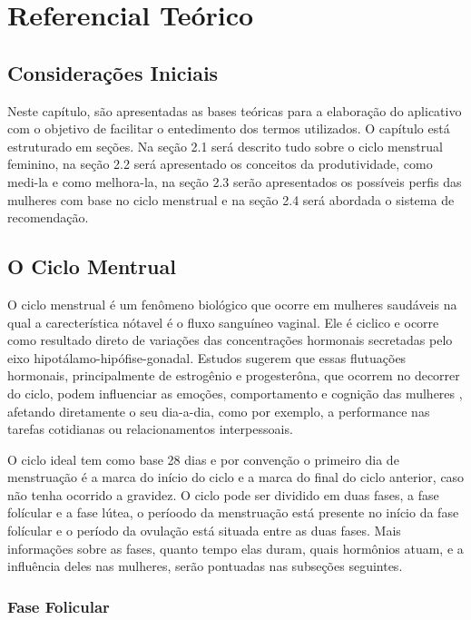 \chapter[Referencial Teórico]{Referencial Teórico}

\section{Considerações Iniciais}

Neste capítulo, são apresentadas as bases teóricas para a elaboração do aplicativo com o objetivo de facilitar o entedimento dos termos utilizados. O capítulo está estruturado em seções. Na seção 2.1 será descrito tudo sobre o ciclo menstrual feminino, na seção 2.2 será apresentado os conceitos da produtividade, como medi-la e como melhora-la, na seção 2.3 serão apresentados os possíveis perfis das mulheres com base no ciclo menstrual e na seção 2.4 será abordada o sistema de recomendação.

\section{O Ciclo Mentrual}

O ciclo menstrual é um fenômeno biológico que ocorre em mulheres saudáveis na qual a carecterística nótavel é o fluxo sanguíneo vaginal\cite{guyton2012}. Ele é ciclico e ocorre como resultado direto de variações das concentrações hormonais secretadas pelo eixo hipotálamo-hipófise-gonadal. Estudos sugerem que essas flutuações hormonais, principalmente de estrogênio e progesterôna, que ocorrem no decorrer do ciclo, podem influenciar as emoções, comportamento e cognição das mulheres \cite{poroma2014}, afetando diretamente o seu dia-a-dia, como por exemplo, a performance nas tarefas cotidianas ou relacionamentos interpessoais.

O ciclo ideal tem como base 28 dias e por convenção o primeiro dia de menstruação é a marca do início do ciclo e a marca do final do ciclo anterior, caso não tenha ocorrido a gravidez. O ciclo pode ser dividido em duas fases, a fase folícular e a fase lútea, o períoodo da menstruação está presente no início da fase folícular e o período da ovulação está situada entre as duas fases. Mais informações sobre as fases, quanto tempo elas duram, quais hormônios atuam, e a influência deles nas mulheres, serão pontuadas nas subseções seguintes. 

 
\subsection{Fase Folicular}

